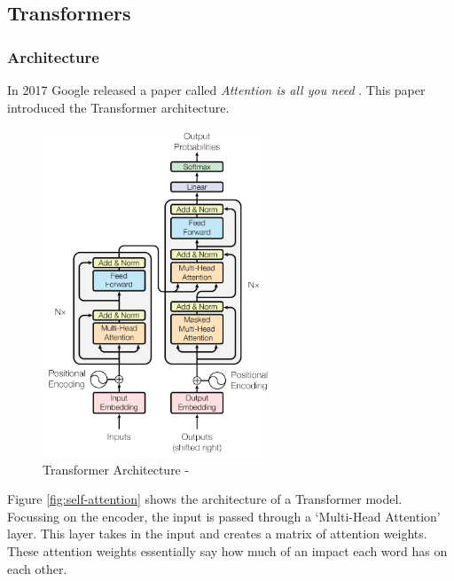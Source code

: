 \subsection{Transformers}
\label{sec:transformers}
\subsubsection{Architecture}
In 2017 Google released a paper called \textit{Attention is all you need} \cite{Attention}. This paper introduced the Transformer
architecture.
\begin{figure}
    \centering
    \includegraphics[width=0.6\textwidth]{../images/transformer.png}
    \caption{Transformer Architecture - \cite{attention}}
    \label{fig:transformer}
\end{figure}

Figure \ref{fig:self-attention} shows the architecture of a Transformer model. Focussing on the encoder, the input is passed through
a `Multi-Head Attention' layer. This layer takes in the input and creates a matrix of attention weights. These attention weights
essentially say how much of an impact each word has on each other.
